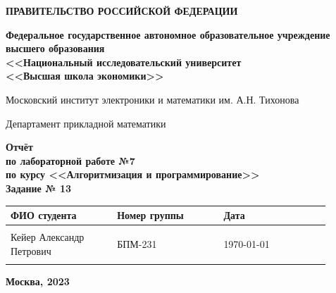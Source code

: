 \documentclass[12pt]{article}
\begin{document}
	
	\thispagestyle{empty}
	\begin{center}
		\textbf{ПРАВИТЕЛЬСТВО РОССИЙСКОЙ ФЕДЕРАЦИИ}
		
		\vspace{5ex}
		
		\textbf{Федеральное государственное автономное образовательное учреждение \\ высшего образования \\ <<Национальный исследовательский университет \\ <<Высшая школа экономики>>}
	\end{center}
	\vspace{5ex}
	
	\begin{center}
		Московский институт электроники и математики им. А.Н. Тихонова  
		
		\vspace{5ex}
		
		Департамент прикладной математики
		
		\vspace{10ex}
		\textbf{Отчёт \\ по лабораторной работе №7 \\ по курсу <<Алгоритмизация и программирование>> \\ Задание № 13}
		\vspace{7ex}
		
	\end{center}
	
	\begin{center} 
		\begin{tabular}{| p{0.3\linewidth}| p{0.3\linewidth}| p{0.3\linewidth}|}
			\hline	
			ФИО студента & Номер группы & Дата \\  \hline
			& & \\  
			Кейер Александр \newline Петрович & БПМ-231 & \today\\  
			& & \\  \hline		
		\end{tabular}
	\end{center}
	
	\begin{center}
		\vspace{3ex}
		
		\vfill
		
		\normalsize
		
		\textbf{Москва, 2023}
	\end{center}
	
\end{document}
